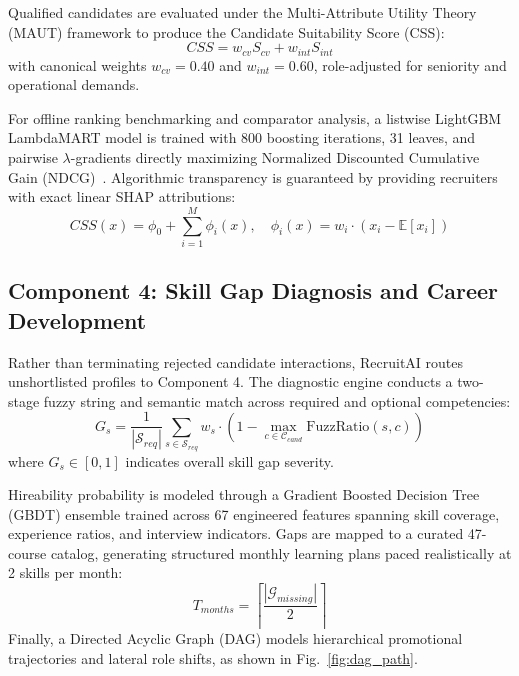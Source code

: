 \documentclass[conference]{IEEEtran}
\begin{document}
Qualified candidates are evaluated under the Multi-Attribute Utility Theory (MAUT) framework to produce the Candidate Suitability Score (CSS):
\begin{equation}
CSS = w_{cv} S_{cv} + w_{int} S_{int}
\end{equation}
with canonical weights $w_{cv} = 0.40$ and $w_{int} = 0.60$, role-adjusted for seniority and operational demands. 

For offline ranking benchmarking and comparator analysis, a listwise LightGBM LambdaMART model is trained with 800 boosting iterations, 31 leaves, and pairwise $\lambda$-gradients directly maximizing Normalized Discounted Cumulative Gain (NDCG)~\cite{burges2010ranknet}. Algorithmic transparency is guaranteed by providing recruiters with exact linear SHAP attributions:
\begin{equation}
CSS(x) = \phi_0 + \sum_{i=1}^{M} \phi_i(x), \quad \phi_i(x) = w_i \cdot (x_i - \mathbb{E}[x_i])
\end{equation}

\subsection{Component 4: Skill Gap Diagnosis and Career Development}
Rather than terminating rejected candidate interactions, RecruitAI routes unshortlisted profiles to Component 4. The diagnostic engine conducts a two-stage fuzzy string and semantic match across required and optional competencies:
\begin{equation}
G_s = \frac{1}{|\mathcal{S}_{req}|} \sum_{s \in \mathcal{S}_{req}} w_s \cdot \left(1 - \max_{c \in \mathcal{C}_{cand}} \text{FuzzRatio}(s, c)\right)
\end{equation}
where $G_s \in [0, 1]$ indicates overall skill gap severity.

Hireability probability is modeled through a Gradient Boosted Decision Tree (GBDT) ensemble trained across 67 engineered features spanning skill coverage, experience ratios, and interview indicators. Gaps are mapped to a curated 47-course catalog, generating structured monthly learning plans paced realistically at 2 skills per month:
\begin{equation}
T_{months} = \left\lceil \frac{|\mathcal{G}_{missing}|}{2} \right\rceil
\end{equation}
Finally, a Directed Acyclic Graph (DAG) models hierarchical promotional trajectories and lateral role shifts, as shown in Fig.~\ref{fig:dag_path}.
\end{document}
